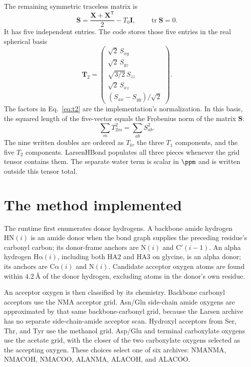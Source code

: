 \documentclass[11pt]{article}
\begin{document}
The remaining symmetric traceless matrix is
\begin{equation}
  \bm S =
  \frac{\bm X+\bm X^{\mathsf T}}{2}-T_0\bm I,
  \qquad \operatorname{tr}\bm S=0 .
  \label{eq:s}
\end{equation}
It has five independent entries. The code stores those five entries in the
real spherical basis
\begin{equation}
  \bm T_2 =
  \begin{pmatrix}
    \sqrt{2}\,S_{xy}\\
    \sqrt{2}\,S_{yz}\\
    \sqrt{3/2}\,S_{zz}\\
    \sqrt{2}\,S_{xz}\\
    (S_{xx}-S_{yy})/\sqrt{2}
  \end{pmatrix}.
  \label{eq:t2}
\end{equation}
The factors in Eq.~\eqref{eq:t2} are the implementation's normalization. In
this basis, the squared length of the five-vector equals the Frobenius norm of
the matrix \(\bm S\):
\begin{equation}
  \sum_m T_{2m}^2=\sum_{ab}S_{ab}^2 .
  \label{eq:t2norm}
\end{equation}
The nine written doubles are ordered as \(T_0\), the three \(T_1\) components,
and the five \(T_2\) components. LarsenHBond populates all three pieces
whenever the grid tensor contains them. The separate water term is scalar in
\(\si{\ppm}\) and is written outside this tensor total.

\section{The method implemented}

The runtime first enumerates donor hydrogens. A backbone amide hydrogen
\(\mathrm{HN}(i)\) is an amide donor when the bond graph supplies the
preceding residue's carbonyl carbon; its donor-frame anchors are
\(\mathrm{N}(i)\) and \(\mathrm{C}'(i-1)\). An alpha hydrogen
\(\mathrm{H\alpha}(i)\), including both \(\mathrm{HA2}\) and
\(\mathrm{HA3}\) on glycine, is an alpha donor; its anchors are
\(\mathrm{C\alpha}(i)\) and \(\mathrm{N}(i)\). Candidate acceptor oxygen atoms
are found within \(\SI{4.2}{\angstrom}\) of the donor hydrogen, excluding
atoms in the donor's own residue.

An acceptor oxygen is then classified by its chemistry. Backbone carbonyl
acceptors use the NMA acceptor grid. Asn/Gln side-chain amide oxygens are
approximated by that same backbone-carbonyl grid, because the Larsen archive
has no separate side-chain-amide acceptor scan. Hydroxyl acceptors from Ser,
Thr, and Tyr use the methanol grid. Asp/Glu and terminal carboxylate oxygens
use the acetate grid, with the closer of the two carboxylate oxygens selected
as the accepting oxygen. These choices select one of six archives:
NMANMA, NMACOH, NMACOO, ALANMA, ALACOH, and ALACOO.
\end{document}
